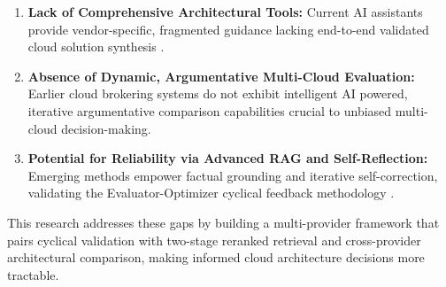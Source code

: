 \begin{enumerate}
    \item \textbf{Lack of Comprehensive Architectural Tools:} Current AI assistants provide vendor-specific, fragmented guidance lacking end-to-end validated cloud solution synthesis \cite{aws2023q, microsoft2024copilot}.
    \item \textbf{Absence of Dynamic, Argumentative Multi-Cloud Evaluation:} Earlier cloud brokering systems \cite{chauhan2014brokering} do not exhibit intelligent AI powered, iterative argumentative comparison capabilities crucial to unbiased multi-cloud decision-making.
    \item \textbf{Potential for Reliability via Advanced RAG and Self-Reflection:} Emerging methods \cite{lewis2020rag, asai2023selfrag} empower factual grounding and iterative self-correction, validating the Evaluator-Optimizer cyclical feedback methodology \cite{anthropic2024agents}.
\end{enumerate}

This research addresses these gaps by building a multi-provider framework that pairs cyclical validation with two-stage reranked retrieval and cross-provider architectural comparison, making informed cloud architecture decisions more tractable.